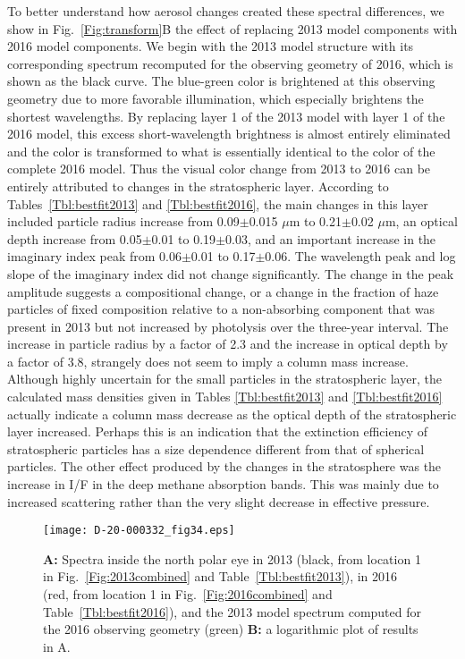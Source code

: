 \documentclass[article,11pt]{emulateapj}
\def\mum{$\mu$m }
\def\mumx{$\mu$m}
\begin{document}
To better understand how aerosol changes created these spectral
differences, we show in Fig.\ \ref{Fig:transform}B the effect of
replacing 2013 model components with 2016 model components.  We begin
with the 2013 model structure with its corresponding spectrum
 recomputed for the observing geometry of
2016, which is shown as the black curve.  The blue-green color is
brightened at this observing geometry due to more favorable
illumination, which especially brightens the shortest wavelengths.  By
replacing layer 1 of the 2013 model with layer 1 of the 2016 model,
this excess short-wavelength brightness is almost entirely eliminated
and the color is transformed to what is essentially identical
to the color of the complete 2016 model. Thus the visual color change from
2013 to 2016 can be entirely attributed to changes in the stratospheric layer.
According to Tables\ \ref{Tbl:bestfit2013} and \ref{Tbl:bestfit2016}, the main changes
in this layer included particle radius increase from 0.09$\pm$0.015 \mum to 0.21$\pm$0.02 \mumx,
an optical depth increase from 0.05$\pm$0.01 to 0.19$\pm$0.03, and an important increase
in the imaginary index peak from 0.06$\pm$0.01 to 0.17$\pm$0.06. The wavelength peak
and log slope of the imaginary index did not change significantly. The change in
the peak amplitude suggests a compositional change, or a change in the fraction of
haze particles of fixed composition relative to a non-absorbing component that
was present in 2013 but not increased by photolysis over the three-year interval.  
The increase in particle radius by a factor of 2.3 and the increase in optical
depth by a factor of 3.8, strangely does not seem to imply a column mass
increase.  Although highly uncertain for the small particles in the stratospheric
layer, the calculated mass densities given in Tables \ref{Tbl:bestfit2013} and \ref{Tbl:bestfit2016}
actually indicate a column mass decrease as the optical depth of the stratospheric
layer increased.  Perhaps this is an indication that the extinction efficiency
of stratospheric particles has a size dependence different from that of spherical
particles.  The other effect
produced by the changes in the stratosphere was the increase in I/F in the deep methane
absorption bands. This was mainly due to increased scattering rather than the very slight
decrease in effective pressure. 

\begin{figure*}[!ht]\centering
\texttt{[image: D-20-000332\_fig34.eps]}
\caption{{\bf A:} Spectra inside the north polar eye in 2013 (black,
  from location 1 in Fig.\ \ref{Fig:2013combined} and
  Table\ \ref{Tbl:bestfit2013}), in 2016 (red, from location 1 in
  Fig.\ \ref{Fig:2016combined} and Table\ \ref{Tbl:bestfit2016}), and
  the 2013 model spectrum computed for the 2016 observing geometry
  (green) {\bf B:} a logarithmic plot of results in A.}
\label{Fig:eyediff}
\end{figure*}
\end{document}

